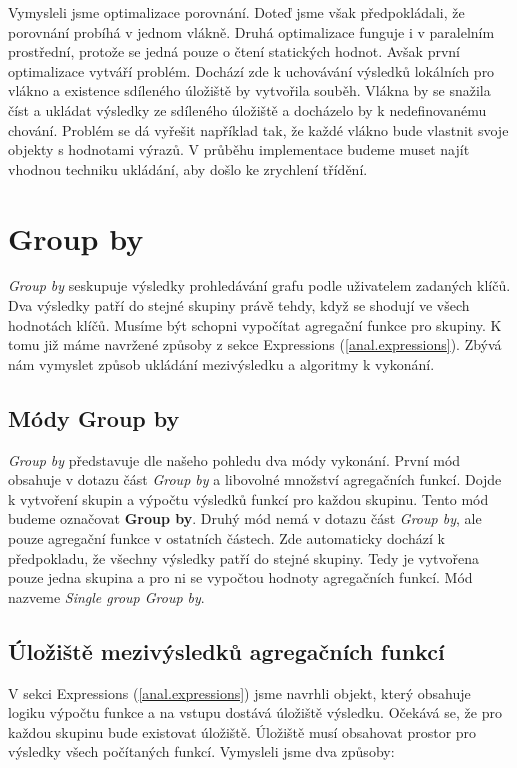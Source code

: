 Vymysleli jsme optimalizace porovnání.
Doteď jsme však předpokládali, že porovnání probíhá v jednom vlákně.
Druhá optimalizace funguje i v paralelním prostřední, protože se jedná pouze o čtení statických hodnot.
Avšak první optimalizace vytváří problém.
Dochází zde k uchovávání výsledků lokálních pro vlákno a existence sdíleného úložiště by vytvořila souběh.
Vlákna by se snažila číst a ukládat výsledky ze sdíleného úložiště a docházelo by k nedefinovanému chování.
Problém se dá vyřešit například tak, že každé vlákno bude vlastnit svoje objekty s hodnotami výrazů.
V průběhu implementace budeme muset najít vhodnou techniku ukládání, aby došlo ke zrychlení třídění.

\section{Group by} \label{anal.groupby}

\textit{Group by} seskupuje výsledky prohledávání grafu podle uživatelem zadaných klíčů.
Dva výsledky patří do stejné skupiny právě tehdy, když se shodují ve všech hodnotách klíčů.
Musíme být schopni vypočítat agregační funkce pro skupiny.
K tomu již máme navržené způsoby z sekce Expressions (\ref{anal.expressions}).
Zbývá nám vymyslet způsob ukládání mezivýsledku a algoritmy k vykonání.

\subsection{Módy Group by}

\textit{Group by} představuje dle našeho pohledu dva módy vykonání.
První mód obsahuje v dotazu část \textit{Group by} a libovolné množství agregačních funkcí.
Dojde k vytvoření skupin a výpočtu výsledků funkcí pro každou skupinu.
Tento mód budeme označovat \textbf{Group by}.
Druhý mód nemá v dotazu část \textit{Group by}, ale pouze agregační funkce v ostatních částech.
Zde automaticky dochází k předpokladu, že všechny výsledky patří do stejné skupiny.
Tedy je vytvořena pouze jedna skupina a pro ni se vypočtou hodnoty agregačních funkcí.
Mód nazveme \textit{Single group Group by}.


\subsection{Úložiště mezivýsledků agregačních funkcí} \label{anal.groupby.uloziste}

V sekci Expressions (\ref{anal.expressions}) jsme navrhli objekt, který obsahuje logiku výpočtu funkce a na vstupu dostává úložiště výsledku.
Očekává se, že pro každou skupinu bude existovat úložiště.
Úložiště musí obsahovat prostor pro výsledky všech počítaných funkcí.
Vymysleli jsme dva způsoby:

